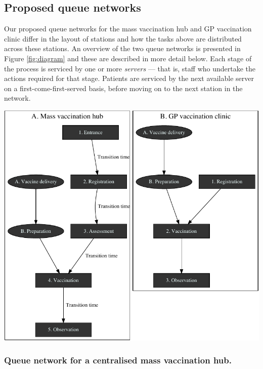 \documentclass{article}
\let\origfigure\figure
\let\endorigfigure\endfigure
\renewenvironment{figure}[1][2] {
    \expandafter\origfigure\expandafter[H]
} {
    \endorigfigure
}
\begin{document}
\hypertarget{proposed-queue-networks}{%
\subsection{Proposed queue networks}\label{proposed-queue-networks}}

Our proposed queue networks for the mass vaccination hub and GP
vaccination clinic differ in the layout of stations and how the tasks
above are distributed across these stations. An overview of the two
queue networks is presented in Figure \ref{fig:diagram} and these are
described in more detail below. Each stage of the process is serviced by
one or more \emph{servers} --- that is, staff who undertake the actions
required for that stage. Patients are serviced by the next available
server on a first-come-first-served basis, before moving on to the next
station in the network.

\begin{figure}

{\centering \includegraphics{Preprint_files/figure-latex/diagram-1} 

}

\caption{Queueing model for arena vaccination site (A) and GP vaccination site (B)}\label{fig:diagram}
\end{figure}

\hypertarget{queue-network-for-a-centralised-mass-vaccination-hub.}{%
\subsubsection{Queue network for a centralised mass vaccination
hub.}\label{queue-network-for-a-centralised-mass-vaccination-hub.}}
\end{document}
